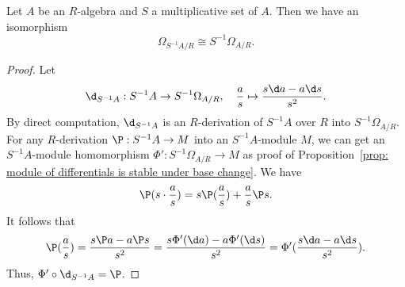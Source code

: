     \begin{proposition}\label{prop: module of differentials is stable under localization}
        Let \(A\) be an \(R\)-algebra and \(S\) a multiplicative set of \(A\).
        Then we have an isomorphism
        \[
            \Omega_{S^{-1}A/R} \cong  S^{-1}\Omega_{A/R}.
        \]
    \end{proposition}
    \begin{proof}
        Let 
        \[ \d_{S^{-1}A}: S^{-1}A \to S^{-1}\Omega_{A/R}, \quad \frac{a}{s} \mapsto \frac{s\d a - a \d s}{s^2}. \]
        By direct computation, \(\d_{S^{-1}A}\) is an \(R\)-derivation of \(S^{-1}A\) over \(R\) into \(S^{-1}\Omega_{A/R}\).
        For any \(R\)-derivation \(\P: S^{-1}A \to M\) into an \(S^{-1}A\)-module \(M\), 
        we can get an \(S^{-1}A\)-module homomorphism \(\Phi': S^{-1}\Omega_{A/R} \to M\) as proof of Proposition~\ref{prop: module of differentials is stable under base change}. 
        We have 
        \[ \P(s \cdot \frac{a}{s}) = s \P(\frac{a}{s}) + \frac{a}{s}\P s.\]
        It follows that 
        \[ \P (\frac{a}{s}) = \frac{s \P a - a \P s}{s^2} = \frac{s \Phi'(\d a) - a \Phi'(\d s)}{s^2} = \Phi'(\frac{s\d a - a \d s}{s^2}).\]
        Thus, \(\Phi' \circ \d_{S^{-1}A} = \P\).
    \end{proof}


